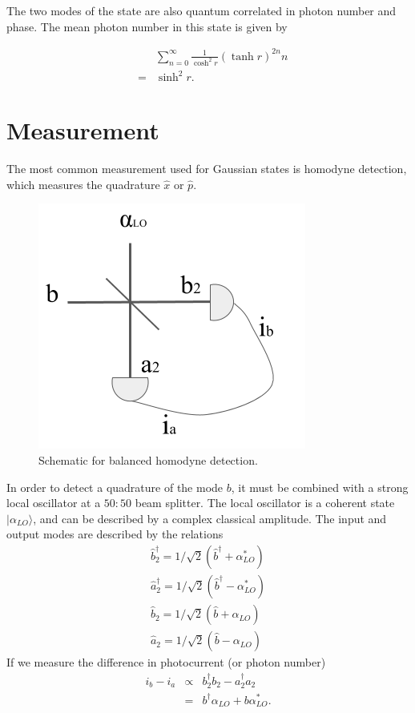 \documentclass[pra,
superscriptaddress,
 amsmath,amssymb,
 aps,twocolumn]{revtex4-1}
\newcommand{\ket}[1]{|{#1}\rangle}
\begin{document}
The two modes of the state are also quantum correlated in photon number and phase.
% 
The mean photon number in this state is given by

\begin{eqnarray}
 & &\sum_{n=0}^{\infty}  \frac{1}{\cosh^2 r }
                    ( \tanh r)^{2n} n \nonumber \\
 &=& \sinh^2 r.
\end{eqnarray}

\section{Measurement}
The most common measurement used for Gaussian states is homodyne detection, which measures the quadrature $\hat x$ or $\hat p$.
\begin{figure}[h!]\centering
\includegraphics[trim = 0cm 0cm 0cm 0cm, clip, width=0.6\linewidth]{homodyne.png}
\caption{\label{fig:homodyne} Schematic for balanced homodyne detection.}
\end{figure}
In order to detect a quadrature of the mode $ b$, it must be combined with a strong local oscillator at a $50:50$ beam splitter. The local oscillator is a coherent state $\ket{\alpha_{LO}}$, and can be described by a complex classical amplitude. The input and output modes are described by the relations
\begin{eqnarray}
\hat b_2^\dagger = 1/\sqrt{2}(\hat b^\dagger + \alpha_{LO}^*)\\
\hat a_2^\dagger = 1/\sqrt{2}(\hat b^\dagger - \alpha_{LO}^*)\\
\hat b_2 = 1/\sqrt{2}(\hat b + \alpha_{LO})\\
\hat a_2 = 1/\sqrt{2}(\hat b - \alpha_{LO})
\end{eqnarray}
If we measure the difference in photocurrent (or photon number)
\begin{eqnarray}
i_b - i_a &\propto& b_2^\dagger b_2 - a_2^\dagger a_2 \\
		&=& b^\dagger \alpha_{LO} + b \alpha_{LO}^*.
\label{eq:homodyne}
\end{eqnarray}
\end{document}
